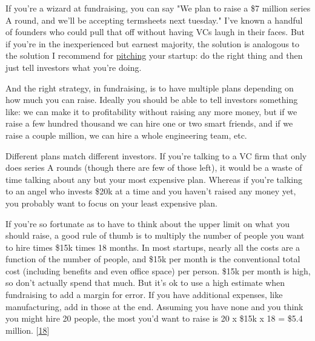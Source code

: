 If you're a wizard at fundraising,
                    you can say "We plan to raise a \$7 million series A round,
                    and we'll be accepting termsheets next tuesday." I've known
                    a handful of founders who could pull that off without having
                    VCs laugh in their faces. But if you're in the inexperienced
                    but earnest majority, the solution is analogous to the
                    solution I recommend for
                    \href{http://www.paulgraham.com/convince.html}{pitching} your startup: do the
                    right thing and then just tell investors what you're
                    doing.

And the right strategy, in fundraising, is
                    to have multiple plans depending on how much you can raise.
                    Ideally you should be able to tell investors something like:
                    we can make it to profitability without raising any more
                    money, but if we raise a few hundred thousand we can hire
                    one or two smart friends, and if we raise a couple million,
                    we can hire a whole engineering team, etc.

Different
                    plans match different investors. If you're talking to a VC
                    firm that only does series A rounds (though there are few of
                    those left), it would be a waste of time talking about any
                    but your most expensive plan. Whereas if you're talking to
                    an angel who invests \$20k at a time and you haven't raised
                    any money yet, you probably want to focus on your least
                    expensive plan.

If you're so fortunate as to have
                    to think about the upper limit on what you should raise, a
                    good rule of thumb is to multiply the number of people you
                    want to hire times \$15k times 18 months. In most startups,
                    nearly all the costs are a function of the number of people,
                    and \$15k per month is the conventional total cost (including
                    benefits and even office space) per person. \$15k per month
                    is high, so don't actually spend that much. But it's ok to
                    use a high estimate when fundraising to add a margin for
                    error. If you have additional expenses, like manufacturing,
                    add in those at the end. Assuming you have none and you
                    think you might hire 20 people, the most you'd want to raise
                    is 20 x \$15k x 18 = \$5.4 million.
                    [\href{\#f18n}{18}]


